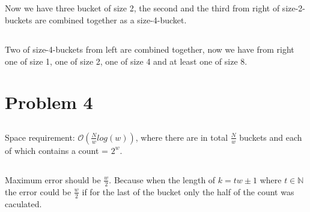\documentclass{article}
\makeatletter
\renewcommand\thesubsection{\@arabic\c@subsection}
\makeatother
\begin{document}
\subsection{}Now we have three bucket of size 2, the second and the third from right of size-2-buckets are combined together as a size-4-bucket.
\subsection{}Two of size-4-buckets from left are combined together, now we have from right one of size 1, one of size 2, one of size 4 and at least one of size 8.
\section{Problem 4}
\renewcommand{\thesubsection}{}
\subsection{}Space requirement: $\mathcal{O}(\frac{N}{w}log(w))$, where there are in total $\frac{N}{w}$ buckets and each of which contains a count = $2^{w}$.
\subsection{}Maximum error should be $\frac{w}{2}$. Because when the length of $k=tw\pm1$ where $t\in\mathbb{N}$ the error could be $\frac{w}{2}$ if for the last of the bucket only the half of the count was caculated.
\end{document}
